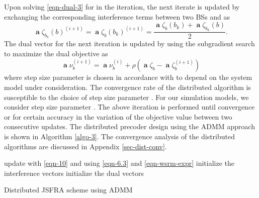 Upon solving \eqref{eqn-dual-3} for  in the  iteration, the next iterate is updated by exchanging the corresponding interference terms between two \acp{BS}  and  as
\begin{equation}
\mbfa{\zeta}_{b_k}(b)^{(i+1)} = \mbfa{\zeta}_{b}(b_k)^{(i+1)} = \frac{\mbfa{\zeta}_{b}(b_k) + \mbfa{\zeta}_{b_k}(b)}{2}.
\label{if-sg-update}
\end{equation}
The dual vector for the next iteration is updated by using the subgradient search to maximize the dual objective as
\begin{equation}
\mbfa{\nu}_b^{(i+1)} = \mbfa{\nu}_b^{(i)} + \rho \left (\mbfa{\zeta}_b - \mbfa{\zeta}_b^{(i+1)} \right )
\label{dual-sg-update}
\end{equation}
where step size parameter \me{\rho} is chosen in accordance with \cite{boyd2011distributed} to depend on the system model under consideration. The convergence rate of the distributed algorithm is susceptible to the choice of step size parameter \me{\rho}. For our simulation models, we consider step size parameter . The above iteration is performed until convergence or for certain accuracy in the variation of the objective value between two consecutive updates. The distributed precoder design using the \ac{ADMM} approach is shown in Algorithm \ref{algo-3}. The convergence analysis of the distributed algorithms are discussed in Appendix \ref{sec-dist-conv}. 
\begin{algorithm}
	\SetAlgoLined
	\DontPrintSemicolon
	\BlankLine
	update  with \eqref{eqn-10} and  using \eqref{eqn-6.3} and \eqref{eqn-wsrm-expr} \;
	initialize the interference vectors  \;
	initialize the dual vectors  \;
	\caption{Distributed \ac{JSFRA} scheme using \ac{ADMM}}
	\label{algo-3}
\end{algorithm}
